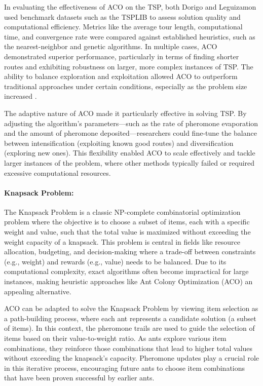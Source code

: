 In evaluating the effectiveness of ACO on the TSP, both Dorigo and Leguizamon used benchmark datasets such as the TSPLIB to assess solution quality and computational efficiency. Metrics like the average tour length, computational time, and convergence rate were compared against established heuristics, such as the nearest-neighbor and genetic algorithms. In multiple cases, ACO demonstrated superior performance, particularly in terms of finding shorter routes and exhibiting robustness on larger, more complex instances of TSP. The ability to balance exploration and exploitation allowed ACO to outperform traditional approaches under certain conditions, especially as the problem size increased \cite{Stutzle2011}.

The adaptive nature of ACO made it particularly effective in solving TSP. By adjusting the algorithm’s parameters—such as the rate of pheromone evaporation and the amount of pheromone deposited—researchers could fine-tune the balance between intensification (exploiting known good routes) and diversification (exploring new ones). This flexibility enabled ACO to scale effectively and tackle larger instances of the problem, where other methods typically failed or required excessive computational resources.


\paragraph{Knapsack Problem:}
The Knapsack Problem is a classic NP-complete combinatorial optimization problem where the objective is to choose a subset of items, each with a specific weight and value, such that the total value is maximized without exceeding the weight capacity of a knapsack. This problem is central in fields like resource allocation, budgeting, and decision-making where a trade-off between constraints (e.g., weight) and rewards (e.g., value) needs to be balanced. Due to its computational complexity, exact algorithms often become impractical for large instances, making heuristic approaches like Ant Colony Optimization (ACO) an appealing alternative.

ACO can be adapted to solve the Knapsack Problem by viewing item selection as a path-building process, where each ant represents a candidate solution (a subset of items). In this context, the pheromone trails are used to guide the selection of items based on their value-to-weight ratio. As ants explore various item combinations, they reinforce those combinations that lead to higher total values without exceeding the knapsack's capacity. Pheromone updates play a crucial role in this iterative process, encouraging future ants to choose item combinations that have been proven successful by earlier ants.

